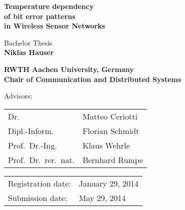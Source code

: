 \titlehead{
	\centering
	\texttt{[image: thesis-tex/logos/comsys-text]}
	\hfill
	\texttt{[image: thesis-tex/logos/rwth]}
} %

\begin{titlepage}

\let\footnotesize\small \let\footnoterule\relax

\hbox{}
\vfill

\centering

\begin{doublespace} 
{ \huge\textbf{\textsf{Temperature dependency \\ \vspace{-0.4em}
of bit error patterns \\ \vspace{-0.4em}
in Wireless Sensor Networks \\ \vspace{-0.4em}}}}
\end{doublespace}
\vskip 2cm

{\large Bachelor Thesis\\[5pt]}
{\large \textbf{Niklas Hauser}}
\vskip 1cm

\textbf{RWTH Aachen University, Germany\\[5pt]
        Chair of Communication and Distributed Systems}
\vskip 2cm

\large

Advisors:
\vskip 2mm

\begin{tabular}{R{7cm}p{7cm}}
Dr. & Matteo Ceriotti\\
Dipl.-Inform. & Florian Schmidt\\
Prof.~Dr.-Ing. & Klaus Wehrle\\
Prof.~Dr.~rer.~nat. & Bernhard Rumpe
\end{tabular}
\vskip 1cm

\begin{tabular}{R{6cm}p{6cm}}
Registration date:  & January 29, 2014 \\
Submission date:    & May 29, 2014 \\
\end{tabular}

\vfill

\end{titlepage}

